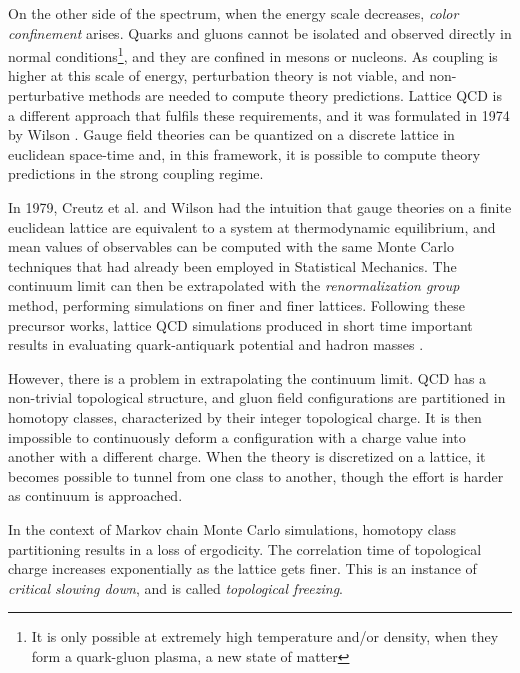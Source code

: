 On the other side of the spectrum, when the energy scale decreases, \emph{color confinement} arises.
Quarks and gluons cannot be isolated and observed directly in normal conditions\footnote{It is only possible at extremely high temperature and/or density, when they form a quark-gluon plasma, a new state of matter},
and they are confined in mesons or nucleons.
As coupling is higher at this scale of energy, perturbation theory is not viable, and non-perturbative methods are needed to compute theory predictions.
Lattice QCD is a different approach that fulfils these requirements, and it was formulated in 1974 by Wilson \cite{wilson:1974}.
Gauge field theories can be quantized on a discrete lattice in euclidean space-time and,
in this framework, it is possible to compute theory predictions in the strong coupling regime.

In 1979, Creutz et al.\@ \cite{creutz:1979} and Wilson \cite{wilson:1980}
had the intuition that gauge theories on a finite euclidean lattice are equivalent to a system at thermodynamic equilibrium,
and mean values of observables can be computed with the same Monte Carlo techniques that had already been employed in Statistical Mechanics.
The continuum limit can then be extrapolated with the \emph{renormalization group} method, performing simulations on finer and finer lattices.
Following these precursor works, lattice QCD simulations produced in short time important results in evaluating quark-antiquark potential and hadron masses
\cite{creutz:1980, hamber-parisi:1981, weingarten:1982}.

However, there is a problem in extrapolating the continuum limit.
QCD has a non-trivial topological structure, and gluon field configurations are partitioned in homotopy classes, characterized by their integer topological charge.
It is then impossible to continuously deform a configuration with a charge value into another with a different charge.
When the theory is discretized on a lattice, it becomes possible to tunnel from one class to another,
though the effort is harder as continuum is approached.

In the context of Markov chain Monte Carlo simulations, homotopy class partitioning results in a loss of ergodicity.
The correlation time of topological charge increases exponentially as the lattice gets finer.
This is an instance of \emph{critical slowing down}, and is called \emph{topological freezing}.

